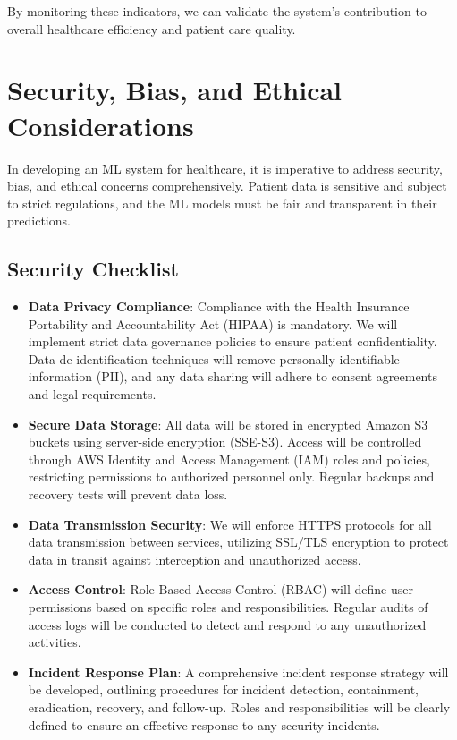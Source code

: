 \documentclass{article}
\begin{document}
By monitoring these indicators, we can validate the system's contribution to overall healthcare efficiency and patient care quality.

\section{Security, Bias, and Ethical Considerations}

In developing an ML system for healthcare, it is imperative to address security, bias, and ethical concerns comprehensively. Patient data is sensitive and subject to strict regulations, and the ML models must be fair and transparent in their predictions.

\subsection{Security Checklist}

\begin{itemize}[leftmargin=*]
    \item \textbf{Data Privacy Compliance}: Compliance with the Health Insurance Portability and Accountability Act (HIPAA) is mandatory. We will implement strict data governance policies to ensure patient confidentiality. Data de-identification techniques will remove personally identifiable information (PII), and any data sharing will adhere to consent agreements and legal requirements.
    \item \textbf{Secure Data Storage}: All data will be stored in encrypted Amazon S3 buckets using server-side encryption (SSE-S3). Access will be controlled through AWS Identity and Access Management (IAM) roles and policies, restricting permissions to authorized personnel only. Regular backups and recovery tests will prevent data loss.
    \item \textbf{Data Transmission Security}: We will enforce HTTPS protocols for all data transmission between services, utilizing SSL/TLS encryption to protect data in transit against interception and unauthorized access.
    \item \textbf{Access Control}: Role-Based Access Control (RBAC) will define user permissions based on specific roles and responsibilities. Regular audits of access logs will be conducted to detect and respond to any unauthorized activities.
    \item \textbf{Incident Response Plan}: A comprehensive incident response strategy will be developed, outlining procedures for incident detection, containment, eradication, recovery, and follow-up. Roles and responsibilities will be clearly defined to ensure an effective response to any security incidents.
\end{itemize}
\end{document}
